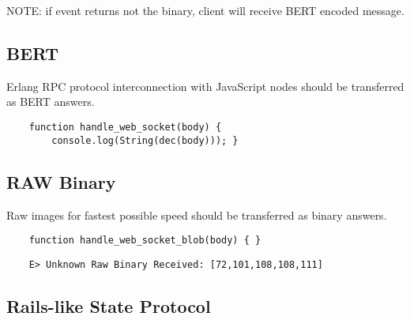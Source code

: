 NOTE: if event returns not the binary, client will receive BERT encoded message.

\subsection*{BERT}

Erlang RPC protocol interconnection with JavaScript nodes should be transferred as BERT answers.

\begin{lstlisting}
    function handle_web_socket(body) {
        console.log(String(dec(body))); }
\end{lstlisting}

\subsection*{RAW Binary}

Raw images for fastest possible speed should be transferred as binary answers.

\begin{lstlisting}
    function handle_web_socket_blob(body) { }
\end{lstlisting}

\begin{lstlisting}
    E> Unknown Raw Binary Received: [72,101,108,108,111]
\end{lstlisting}

\subsection{Rails-like State Protocol}
